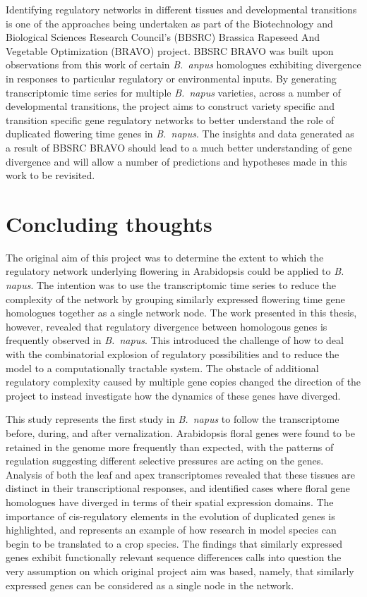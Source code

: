 \documentclass[12pt,]{book}
\begin{document}
Identifying regulatory networks in different tissues and developmental
transitions is one of the approaches being undertaken as part of the
Biotechnology and Biological Sciences Research Council's (BBSRC)
Brassica Rapeseed And Vegetable Optimization (BRAVO) project. BBSRC
BRAVO was built upon observations from this work of certain
\emph{B.~anpus} homologues exhibiting divergence in responses to
particular regulatory or environmental inputs. By generating
transcriptomic time series for multiple \emph{B.~napus} varieties,
across a number of developmental transitions, the project aims to
construct variety specific and transition specific gene regulatory
networks to better understand the role of duplicated flowering time
genes in \emph{B.~napus}. The insights and data generated as a result of
BBSRC BRAVO should lead to a much better understanding of gene
divergence and will allow a number of predictions and hypotheses made in
this work to be revisited.

\section{Concluding thoughts}\label{concluding-thoughts}

The original aim of this project was to determine the extent to which
the regulatory network underlying flowering in Arabidopsis could be
applied to \emph{B. napus}. The intention was to use the transcriptomic
time series to reduce the complexity of the network by grouping
similarly expressed flowering time gene homologues together as a single
network node. The work presented in this thesis, however, revealed that
regulatory divergence between homologous genes is frequently observed in
\emph{B.~napus}. This introduced the challenge of how to deal with the
combinatorial explosion of regulatory possibilities and to reduce the
model to a computationally tractable system. The obstacle of additional
regulatory complexity caused by multiple gene copies changed the
direction of the project to instead investigate how the dynamics of
these genes have diverged.

This study represents the first study in \emph{B.~napus} to follow the
transcriptome before, during, and after vernalization. Arabidopsis
floral genes were found to be retained in the genome more frequently
than expected, with the patterns of regulation suggesting different
selective pressures are acting on the genes. Analysis of both the leaf
and apex transcriptomes revealed that these tissues are distinct in
their transcriptional responses, and identified cases where floral gene
homologues have diverged in terms of their spatial expression domains.
The importance of cis-regulatory elements in the evolution of duplicated
genes is highlighted, and represents an example of how research in model
species can begin to be translated to a crop species. The findings that
similarly expressed genes exhibit functionally relevant sequence
differences calls into question the very assumption on which original
project aim was based, namely, that similarly expressed genes can be
considered as a single node in the network.
\end{document}
